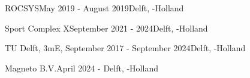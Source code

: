 \begin{rSection}{}
    \begin{experienceItem}
        {ROCSYS}{May 2019 - August 2019}{}{Delft, -Holland}
    \end{experienceItem}


    \begin{experienceItem}
        {Sport Complex X}{September 2021 -  2024}{}{Delft, -Holland}
    \end{experienceItem}

    \begin{experienceItem}
        {TU Delft, 3mE, }{September 2017 - September 2024}{}{Delft, -Holland}
    \end{experienceItem}

    \begin{experienceItem}
        {Magneto B.V.}{April 2024 - }{}{Delft, -Holland}
    \end{experienceItem}

\end{rSection}

